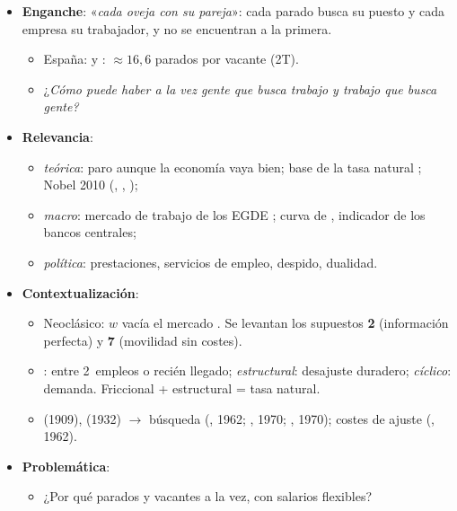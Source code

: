 \documentclass{article}
\begin{document}
\cabecerarepaso
\begin{columnas}

\begin{itemize}
\item \textbf{Enganche}: «\emph{cada oveja con su pareja}»: cada parado busca su puesto y cada empresa su trabajador, y no se encuentran a la primera.
  \begin{itemize}
  \item España:  y : $\approx16{,}6$ parados por vacante (2T).
  \item ¿\emph{Cómo puede haber a la vez gente que busca trabajo y trabajo que busca gente?}
  \end{itemize}
\item \textbf{Relevancia}:
  \begin{itemize}
  \item \emph{teórica}: paro aunque la economía vaya bien; base de la tasa natural ; Nobel 2010 (, , );
  \item \emph{macro}: mercado de trabajo de los EGDE ; curva de , indicador de los bancos centrales;
  \item \emph{política}: prestaciones, servicios de empleo, despido, dualidad.
  \end{itemize}
\item \textbf{Contextualización}:
  \begin{itemize}
  \item Neoclásico: $w$ vacía el mercado . Se levantan los supuestos \textbf{2} (información perfecta) y \textbf{7} (movilidad sin costes).
  \item {}: entre 2~empleos o recién llegado; \emph{estructural}: desajuste duradero; \emph{cíclico}: demanda. Friccional + estructural = tasa natural.
  \item {} (1909),  (1932) $\to$ búsqueda (, 1962; , 1970; , 1970); costes de ajuste (, 1962).
  \end{itemize}
\item \textbf{Problemática}:
  \begin{itemize}
  \item ¿Por qué parados y vacantes a la vez, con salarios flexibles?

\end{itemize}
\end{itemize}
\end{columnas}
\end{document}
